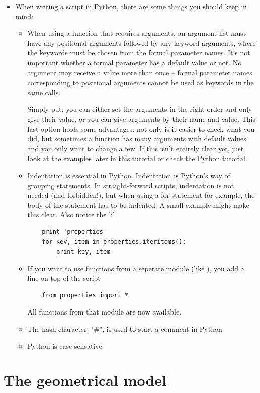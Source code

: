 \begin{itemize}
\begin{itemize}
	\end{itemize}
\item When writing a script in Python, there are some things you should keep in mind:
	\begin{itemize}
	\item When using a function that requires arguments, an argument list must have any positional arguments followed by any keyword arguments, where the keywords must be chosen from the formal parameter names. It's not important whether a formal parameter has a default value or not. No argument may receive a value more than once -- formal parameter names corresponding to positional arguments cannot be used as keywords in the same calls. 

Simply put: you can either set the arguments in the right order and only give their value, or you can give arguments by their name and value. This last option holds some advantages: not only is it easier to check what you did, but sometimes a function has many arguments with default values and you only want to change a few.
If this isn't entirely clear yet, just look at the examples later in this tutorial or check the Python tutorial.
	\item Indentation is essential in Python. Indentation is Python's way of grouping statements. In straight-forward scripts, indentation is not needed (and forbidden!), but when using a for-statement for example, the body of the statement has to be indented. A small example might make this clear. Also notice the ':' 
\begin{verbatim}
	print 'properties'
	for key, item in properties.iteritems():
	    print key, item
\end{verbatim}
	\item If you want to use functions from a seperate module (like ), you add a line on top of the script
\begin{verbatim}
	from properties import *
\end{verbatim}
All functions from that module are now available.
	\item The hash character, "\#", is used to start a comment in Python.
	\item Python is case sensative.
	\end{itemize}
\end{itemize}


\section{The geometrical model}
\label{sec:geom}


